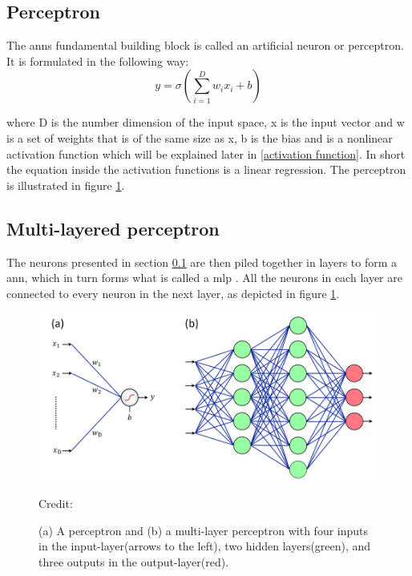     \subsection{Perceptron} \label{perceptron}
        The \gls{ann}s fundamental building block is called an artificial neuron or perceptron. It is formulated in the following way\cite{razavi2021deep_exp_per}:
            \begin{equation} \label{eq_perceptron}
                y = \sigma(\sum_{i=1}^{D}w_ix_i + b)
            \end{equation}
            
        where D is the number dimension of the input space, x is the input vector and w is a set of weights that is of the same size as x, b is the bias and {\textsigma} is a nonlinear activation function which will be explained later in \ref{activation function}. In short the equation inside the activation functions is a linear regression. The perceptron is illustrated in figure \ref{Perceptron / MLP}.
    
    \subsection{Multi-layered perceptron} \label{MLP}
        The neurons presented in section \ref{perceptron} are then piled together in layers to form a \gls{ann}, which in turn forms what is called a \gls{mlp} \cite{razavi2021deep_exp_per}. All the neurons in each layer are connected to every neuron in the next layer, as depicted in figure \ref{Perceptron / MLP}.
        
            \begin{figure}[H]
                \centering
                \includegraphics[scale=0.5]{figures/perceptron.png}
                \caption{(a) A perceptron and (b) a multi-layer perceptron with four inputs in the input-layer(arrows to the left), two hidden layers(green), and three outputs in the output-layer(red).}
              	\medskip 
                \hspace*{15pt}\hbox{\scriptsize Credit: \citeauthor{razavi2021deep_exp_DL}\cite{razavi2021deep_exp_DL}}
                \label{Perceptron / MLP}
            \end{figure}
        
